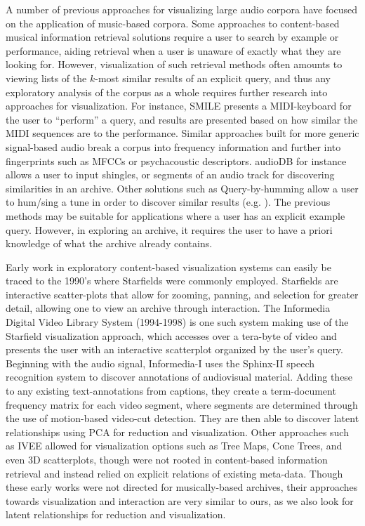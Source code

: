 \documentclass[a4paper,10pt,final]{ThesisStyle}
\begin{document}
A number of previous approaches for visualizing large audio corpora have focused on the application of music-based corpora.  Some approaches to content-based musical information retrieval solutions require a user to search by example or performance, aiding retrieval when a user is unaware of exactly what they are looking for.  However, visualization of such retrieval methods often amounts to viewing lists of the $k$-most similar results of an explicit query, and thus any exploratory analysis of the corpus as a whole requires further research into approaches for visualization.  For instance, SMILE \cite{Melucci2000} presents a MIDI-keyboard for the user to ``perform'' a query, and results are presented based on how similar the MIDI sequences are to the performance.  Similar approaches built for more generic signal-based audio break a corpus into frequency information and further into fingerprints such as MFCCs or psychacoustic descriptors.  audioDB \cite{Casey2008c,Rhodes2010} for instance allows a user to input shingles, or segments of an audio track for discovering similarities in an archive.  Other solutions such as Query-by-humming allow a user to hum/sing a tune in order to discover similar results (e.g. \cite{Wang2006a,Cartwright}).  The previous methods may be suitable for applications where a user has an explicit example query.  However, in exploring an archive, it requires the user to have a priori knowledge of what the archive already contains.

Early work in exploratory content-based visualization systems can easily be traced to the 1990's where Starfields were commonly employed.  Starfields are interactive scatter-plots that allow for zooming, panning, and selection for greater detail, allowing one to view an archive through interaction.  The Informedia Digital Video Library System (1994-1998) \cite{Himmel1998,Christel1998} is one such system making use of the Starfield visualization approach, which accesses over a tera-byte of video and presents the user with an interactive scatterplot organized by the user's query.  Beginning with the audio signal, Informedia-I uses the Sphinx-II speech recognition system to discover annotations of audiovisual material.  Adding these to any existing text-annotations from captions, they create a term-document frequency matrix for each video segment, where segments are determined through the use of motion-based video-cut detection.  They are then able to discover latent relationships using PCA for reduction and visualization.  Other approaches such as IVEE \cite{Ahlberg1995} allowed for visualization options such as Tree Maps, Cone Trees, and even 3D scatterplots, though were not rooted in content-based information retrieval and instead relied on explicit relations of existing meta-data.  Though these early works were not directed for musically-based archives, their approaches towards visualization and interaction are very similar to ours, as we also look for latent relationships for reduction and visualization.
\end{document}
